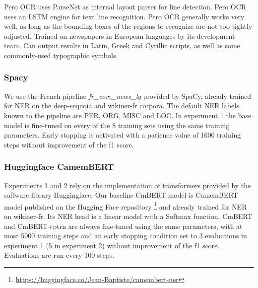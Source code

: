 Pero OCR uses ParseNet  as internal layout parser for line detection.
Pero OCR uses an LSTM engine  for text line recognition.
Pero OCR generally works very well, as long as the bounding boxes of the regions to recognize are not too tightly adjusted.
Trained on newspapers in European languages by its development team.
Can output results in Latin, Greek and Cyrillic scripts, as well as some commonly-used typographic symbols.



\subsubsection{Spacy}
We use the French pipeline \textit{fr\_core\_news\_lg} provided by SpaCy, already trained for NER on the deep-sequoia and wikiner-fr corpora.
The default NER labels known to the pipeline are PER, ORG, MISC and LOC.
In experiment 1 the base model is fine-tuned on every of the 8 training sets using the same training parameters.
Early stopping is activated with a patience value of 1600 training steps without improvement of the f1 score.





\subsubsection{Huggingface CamemBERT}
Experiments 1 and 2 rely on the implementation of transformers provided by the software library Huggingface.
Our baseline CmBERT model is CamemBERT model published on the Hugging Face repository \footnote{\url{https://huggingface.co/Jean-Baptiste/camembert-ner}} and already trained for NER on wikiner-fr.
Its NER head is a linear model with a Softmax function.
CmBERT and CmBERT+ptrn are always fine-tuned using the same parameters, with at most 5000 training steps and an early stopping condition set to 3 evaluations in experiment 1 (5 in experiment 2) without improvement of the f1 score. Evaluations are run every 100 steps.



